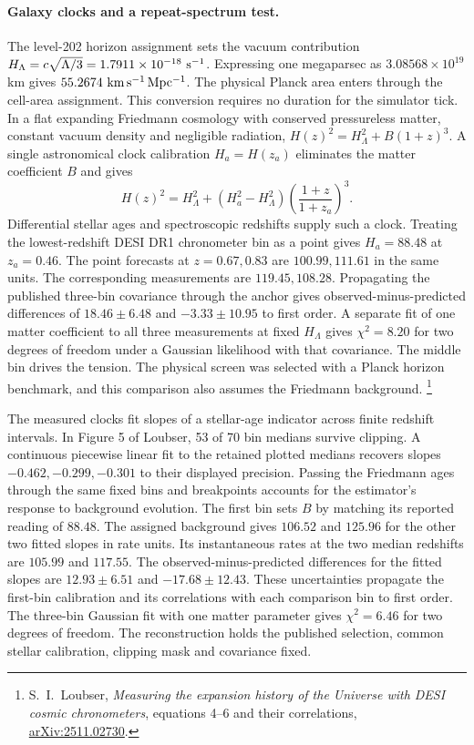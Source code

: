 \documentclass[11pt]{article}
\theoremstyle{remark}
\theoremstyle{plain}
\begin{document}
\paragraph{Galaxy clocks and a repeat-spectrum test.}
The level-202 horizon assignment sets the vacuum contribution
$H_\Lambda=c\sqrt{\Lambda/3}=1.7911\times10^{-18}\ {\rm s}^{-1}$.
Expressing one megaparsec as $3.08568\times10^{19}$ km gives
$55.2674\ {\rm km\,s^{-1}\,Mpc^{-1}}$. The physical Planck area enters
through the cell-area assignment. This conversion requires no duration
for the simulator tick.
In a flat expanding Friedmann cosmology with conserved pressureless
matter, constant vacuum density and negligible radiation,
$H(z)^2=H_\Lambda^2+B(1+z)^3$. A single astronomical clock calibration
$H_a=H(z_a)$ eliminates the matter coefficient $B$ and gives
\[
 H(z)^2=H_\Lambda^2+
 (H_a^2-H_\Lambda^2)\left(\frac{1+z}{1+z_a}\right)^3 .
\]
Differential stellar ages and spectroscopic redshifts supply such a clock.
Treating the lowest-redshift DESI DR1 chronometer bin as a point gives
$H_a=88.48$ at $z_a=0.46$. The point forecasts at $z=0.67,0.83$ are
$100.99,111.61$ in the same units. The corresponding measurements are
$119.45,108.28$. Propagating the published three-bin covariance through
the anchor gives observed-minus-predicted differences of $18.46\pm6.48$
and $-3.33\pm10.95$ to first order. A separate fit of one matter
coefficient to all three measurements at fixed $H_\Lambda$ gives
$\chi^2=8.20$ for two degrees of freedom under a Gaussian likelihood
with that covariance. The middle bin drives the tension. The physical
screen was selected with a Planck horizon benchmark, and this comparison
also assumes the Friedmann background.%
\footnote{S.~I.~Loubser, \emph{Measuring the expansion history of the
Universe with DESI cosmic chronometers}, equations 4--6 and their
correlations, \href{https://arxiv.org/abs/2511.02730}{arXiv:2511.02730}.}

The measured clocks fit slopes of a stellar-age indicator across finite
redshift intervals. In Figure 5 of Loubser, 53 of 70 bin medians survive
clipping. A continuous piecewise linear fit to the retained plotted
medians recovers slopes $-0.462,-0.299,-0.301$ to their displayed
precision. Passing the Friedmann ages through the same fixed bins and
breakpoints accounts for the estimator's response to background
evolution. The first bin sets $B$ by matching its reported reading
of $88.48$. The assigned background gives $106.52$ and $125.96$ for
the other two fitted slopes in rate units. Its instantaneous rates at the two median redshifts
are $105.99$ and $117.55$. The observed-minus-predicted differences for
the fitted slopes are $12.93\pm6.51$ and $-17.68\pm12.43$. These
uncertainties propagate the first-bin calibration and its correlations
with each comparison bin to first order.
The three-bin Gaussian fit with one matter parameter gives $\chi^2=6.46$
for two degrees of freedom. The reconstruction holds the published
selection, common stellar calibration, clipping mask and covariance fixed.
\end{document}
